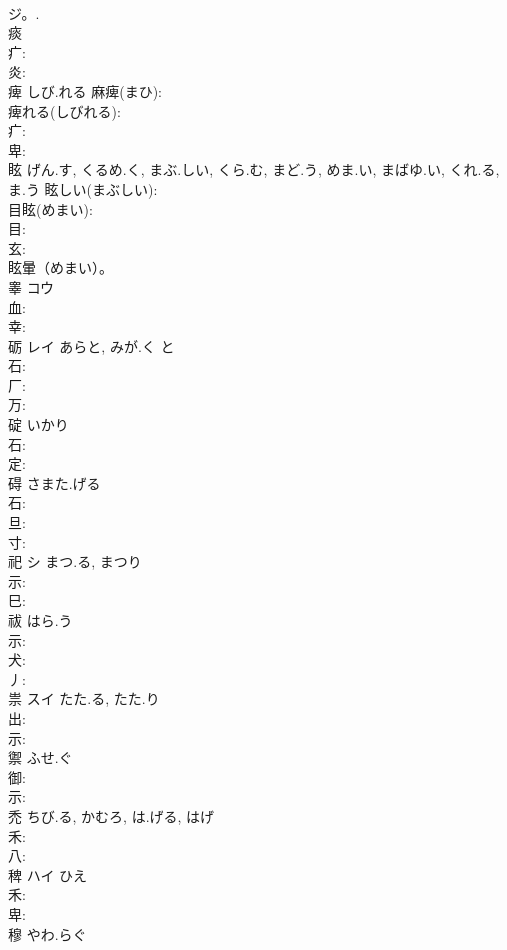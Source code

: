 \documentclass[8pt]{extreport}
\begin{document}
\begin{CJK}{UTF8}{min}
\\	ジ。.
\\	痰						
\\	疒: 
\\	炎: 
\\	痺		しび.れる			麻痺(まひ): 
\\	痺れる(しびれる): 
\\	疒: 
\\	卑: 
\\	眩		げん.す, くるめ.く, まぶ.しい, くら.む, まど.う, めま.い, まばゆ.い, くれ.る, ま.う			眩しい(まぶしい): 
\\	目眩(めまい): 
\\	目: 
\\	玄: 
\\	眩暈（めまい）。 
\\	睾	コウ			
\\	血: 
\\	幸: 
\\	砺	レイ	あらと, みが.く	と	
\\	石: 
\\	厂: 
\\	万: 
\\	碇		いかり				
\\	石: 
\\	定: 
\\	碍		さまた.げる				
\\	石: 
\\	旦: 
\\	寸: 
\\	祀	シ	まつ.る, まつり		
\\	示: 
\\	巳: 
\\	祓		はら.う				
\\	示: 
\\	犬: 
\\	丿: 
\\	祟	スイ	たた.る, たた.り		
\\	出: 
\\	示: 
\\	禦		ふせ.ぐ				
\\	御: 
\\	示: 
\\	禿		ちび.る, かむろ, は.げる, はげ				
\\	禾: 
\\	八: 
\\	稗	ハイ	ひえ		
\\	禾: 
\\	卑: 
\\	穆		やわ.らぐ				

\end{CJK}
\end{document}
